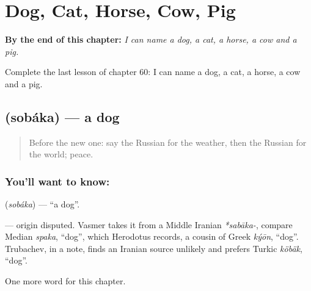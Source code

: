 
\chapter{Dog, Cat, Horse, Cow, Pig}
\label{ch:ru-dog-cat-horse-cow-pig}

\begin{chapteropening}
\textbf{By the end of this chapter:} \emph{I can name a dog, a cat, a horse, a cow and a pig.}

Complete the last lesson of chapter 60: I can name a dog, a cat, a horse, a cow and a pig.
\end{chapteropening}

\section[\texorpdfstring{\ru{собака} (sobáka)}{собака (sobáka)}]{ (sobáka) — a dog}

\label{lesson:RU-C60-dog}



\begin{quote}
Before the new one: say the Russian for the weather, then the Russian for the world; peace.
\end{quote}

\subsection*{You'll want to know: }
\textbf{} (\emph{sobáka}) — \textquotedblleft{}a dog\textquotedblright{}.

\begin{cousinweb}
\textbf{} — origin disputed. Vasmer takes it from a Middle Iranian \emph{*sabāka-}, compare Median \emph{spaka}, \textquotedblleft{}dog\textquotedblright{}, which Herodotus records, a cousin of Greek \emph{kýōn}, \textquotedblleft{}dog\textquotedblright{}. Trubachev, in a note, finds an Iranian source unlikely and prefers Turkic \emph{köbäk}, \textquotedblleft{}dog\textquotedblright{}.
\end{cousinweb}

\begin{grammarlens}[title={What you've built}]
One more word for this chapter.
\end{grammarlens}


